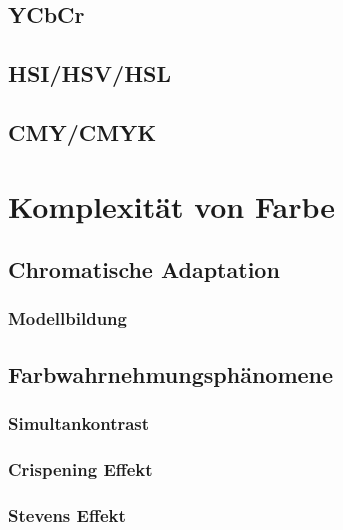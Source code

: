 \documentclass[a4paper, 11pt, accentcolor = tud3b]{tudreport}
\begin{document}
			\subsection{YCbCr} %

			\subsection{HSI/HSV/HSL} %

			\subsection{CMY/CMYK} %

		\section{Komplexität von Farbe} %

			\subsection{Chromatische Adaptation} %

				\subsubsection{Modellbildung} %

			\subsection{Farbwahrnehmungsphänomene} %

				\subsubsection{Simultankontrast} %

				\subsubsection{Crispening Effekt} %

				\subsubsection{Stevens Effekt} %
\end{document}
